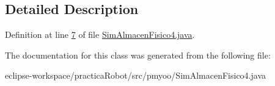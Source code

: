 \subsection{Detailed Description}


Definition at line \mbox{\hyperlink{_sim_almacen_fisico4_8java_source_l00007}{7}} of file \mbox{\hyperlink{_sim_almacen_fisico4_8java_source}{Sim\+Almacen\+Fisico4.\+java}}.



The documentation for this class was generated from the following file\+:\begin{DoxyCompactItemize}
\item 
eclipse-\/workspace/practica\+Robot/src/pmyoo/Sim\+Almacen\+Fisico4.\+java\end{DoxyCompactItemize}
